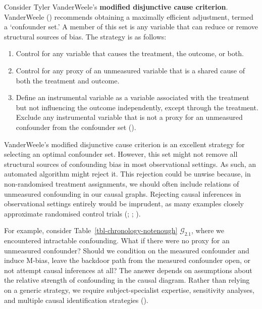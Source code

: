 \documentclass[
  single column]{article}
\begin{document}
Consider Tyler VanderWeele's \textbf{modified disjunctive cause
criterion}. VanderWeele ()
recommends obtaining a maximally efficient adjustment, termed a
`confounder set.' A member of this set is any variable that can reduce
or remove structural sources of bias. The strategy is as follows:

\begin{enumerate}
\def\labelenumi{\alph{enumi}.}
\item
  Control for any variable that causes the treatment, the outcome, or
  both.
\item
  Control for any proxy of an unmeasured variable that is a shared cause
  of both the treatment and outcome.
\item
  Define an instrumental variable as a variable associated with the
  treatment but not influencing the outcome independently, except
  through the treatment. Exclude any instrumental variable that is not a
  proxy for an unmeasured confounder from the confounder set
  ().
\end{enumerate}

VanderWeele's modified disjunctive cause criterion is an excellent
strategy for selecting an optimal confounder set. However, this set
might not remove all structural sources of confounding bias in most
observational settings. As such, an automated algorithm might reject it.
This rejection could be unwise because, in non-randomised treatment
assignments, we should often include relations of unmeasured confounding
in our causal graphs. Rejecting causal inferences in observational
settings entirely would be imprudent, as many examples closely
approximate randomised control trials
(; ;
).

For example, consider Table~\ref{tbl-chronology-notenough}
\(\mathcal{G}_{2.1}\), where we encountered intractable confounding.
What if there were no proxy for an unmeasured confounder? Should we
condition on the measured confounder and induce M-bias, leave the
backdoor path from the measured confounder open, or not attempt causal
inferences at all? The answer depends on assumptions about the relative
strength of confounding in the causal diagram. Rather than relying on a
generic strategy, we require subject-specialist expertise, sensitivity
analyses, and multiple causal identification strategies
().
\end{document}
